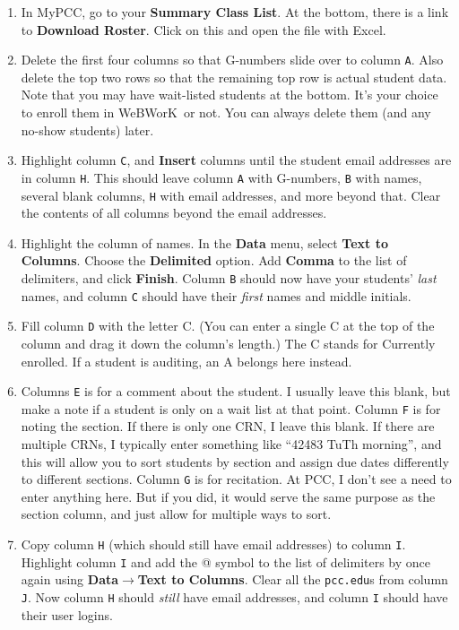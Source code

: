 \documentclass[12pt]{article}
\newcommand{\menu}[1]{\textbf{#1}}
\newcommand{\WW}{WeBWorK}
\begin{document}
\begin{enumerate}
\item In MyPCC, go to your \menu{Summary Class List}. At the bottom, there is a link to \menu{Download Roster}. Click on this and open the file with Excel.
\item Delete the first four columns so that G-numbers slide over to column \texttt{A}. Also delete the top two rows so that the remaining top row is actual student data. Note that you may have wait-listed students at the bottom. It's your choice to enroll them in \WW\ or not. You can always delete them (and any no-show students) later.
\item Highlight column \texttt{C}, and \menu{Insert} columns until the student email addresses are in column \texttt{H}. This should leave column \texttt{A} with G-numbers, \texttt{B} with names, several blank columns, \texttt{H} with email addresses, and more beyond that. Clear the contents of all columns beyond the email addresses.
\item Highlight the column of names. In the \menu{Data} menu, select \menu{Text to Columns}. Choose the \menu{Delimited} option. Add \menu{Comma} to the list of delimiters, and click \menu{Finish}. Column \texttt{B} should now have your students' \emph{last} names, and column \texttt{C} should have their \emph{first} names and middle initials.
\item Fill column \texttt{D} with the letter C. (You can enter a single C at the top of the column and drag it down the column's length.) The C stands for Currently enrolled. If a student is auditing, an A belongs here instead.
\item Columns \texttt{E} is for a comment about the student. I usually leave this blank, but make a note if a student is only on a wait list at that point.  Column \texttt{F} is for noting the section. If there is only one CRN, I leave this blank. If there are multiple CRNs, I typically enter something like ``42483 TuTh morning'', and this will allow you to sort students by section and assign due dates differently to different sections. Column \texttt{G} is for recitation. At PCC, I don't see a need to enter anything here. But if you did, it would serve the same purpose as the section column, and just allow for multiple ways to sort.
\item Copy column \texttt{H} (which should still have email addresses) to column \texttt{I}. Highlight column \texttt{I} and add the
@ symbol to the list of delimiters by once again using \menu{Data}$\rightarrow$\menu{Text to Columns}. Clear all the \texttt{pcc.edu}s from column \texttt{J}. Now column \texttt{H} should \emph{still} have email addresses, and column \texttt{I} should have their user logins.

\end{enumerate}
\end{document}
